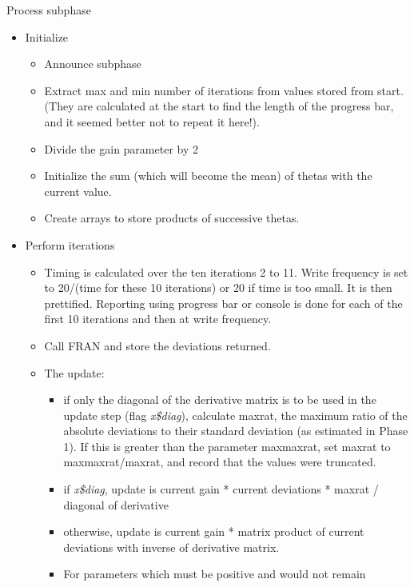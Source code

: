 \documentclass[12pt,a4paper]{article}
\makeatletter
\renewcommand{\=}{\,=\,}
\newcommand{\+}{\,+\,}
\newcommand{\nm}[1]{\textsf{\small #1}}
\newcommand{\nnm}[1]{\textsf{\small\textit{#1}}}
\newcommand{\nmm}[1]{\nnm{#1}}
\renewcommand{\subsubsection}{\@startsection{subsubsection}{3}
                {0pt}{0.5\baselineskip}{0.3\baselineskip}
                {\it\sffamily} }
\makeatother
\begin{document}
\subsubsection{Process subphase}
\begin{itemize}
\item Initialize
  \begin{itemize}
  \item
    Announce subphase
  \item Extract max and min number of iterations from values stored
    from start. (They are calculated at the start to find the length
    of the progress bar, and it seemed better not to repeat it here!).
  \item Divide the gain parameter by 2
  \item Initialize the sum (which will become the mean) of thetas with
    the current value.
  \item
    Create arrays to store products of successive thetas.
  \end{itemize}
\item
  Perform iterations
  \begin{itemize}
  \item Timing is calculated over the ten iterations 2 to 11. Write frequency is
    set to 20/(time for these 10 iterations) or 20 if time is too small.  It is
    then prettified. Reporting using progress bar or console is done for each of
    the first 10 iterations and then at write frequency.
\item
  Call \nm{FRAN} and store the deviations returned.
  \item The update:
    \begin{itemize}
    \item if only the diagonal of the derivative matrix is to be used
      in the update step (flag \nnm{x\$diag}), calculate \nm{maxrat},
      the maximum ratio of the absolute deviations to their standard
      deviation (as estimated in Phase 1). If this is greater than the
      parameter \nm{maxmaxrat}, set \nm{maxrat} to
      \nm{maxmaxrat}/\nm{maxrat}, and record that the values were
      truncated. \label{sec:maxrat}
    \item
      if \nmm{x\$diag},
      update is current gain * current deviations * \nm{maxrat} /
      diagonal of derivative
    \item otherwise, update is current gain * matrix product of
      current deviations with inverse of derivative matrix.
    \item For parameters which must be positive and would not remain

\end{itemize}
\end{itemize}
\end{itemize}
\end{document}
